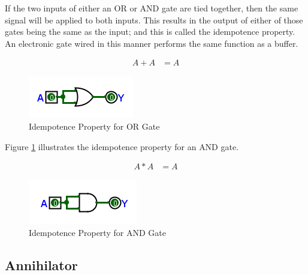 If the two inputs of either an \textsf{OR} or \textsf{AND} gate are tied together, then the same signal will be applied to both inputs. This results in the output of either of those gates being the same as the input; and this is called the idempotence property. An electronic gate wired in this manner performs the same function as a buffer. 


\begin{align}
  \label{BF:eq:idempotence_for_or}
  A + A &= A 
\end{align}

\begin{figure}[H]
	\centering
	\includegraphics[width=\maxwidth{.95\linewidth}]{gfx/04_12}
	\caption{Idempotence Property for OR Gate}
	\label{fig:04_12}
\end{figure}

Figure \ref{fig:04_12} illustrates the idempotence property for an \textsf{AND} gate.


\begin{align}
  \label{BF:eq:idempotence_for_and}
  A * A &= A 
\end{align}

\begin{figure}[H]
	\centering
	\includegraphics[width=\maxwidth{.95\linewidth}]{gfx/04_13}
	\caption{Idempotence Property for AND Gate}
	\label{fig:04_13}
\end{figure}

\subsection{Annihilator}
\label{BF:subsec:annihilator}

